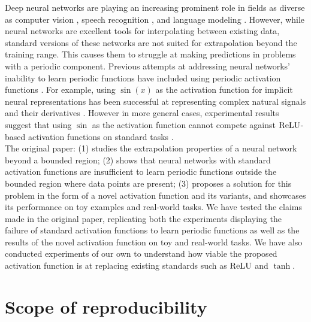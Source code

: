 Deep neural networks are playing an increasing prominent role in fields as diverse as computer vision \cite{10.1007/978-3-030-11024-6_1}, speech recognition \cite{deng_2016}, and language modeling \cite{melis2017state}. However, while neural networks are excellent tools for interpolating between existing data, standard versions of these networks are not suited for extrapolation beyond the training range. This causes them to struggle at making predictions in problems with a periodic component. Previous attempts at addressing neural networks' inability to learn periodic functions have included using periodic activation functions \cite{fourier_one, zhumekenov2019fourier}. For example, using $\sin(x)$ as the activation function for implicit neural representations has been successful at representing complex natural signals and their derivatives \cite{sitzmann2020implicit}. However in more general cases, experimental results suggest that using $\sin$ as the activation function cannot compete against $ \operatorname{ReLU} $-based activation functions \cite{Ramachandran2017SwishAS, DBLP:conf/icml/NairH10, clevert2016fast, xu2015empirical} on standard tasks \cite{Parascandolo2017TamingTW}. \\

The original paper: (1) studies the extrapolation properties of a neural network beyond a bounded region; (2) shows that neural networks with standard activation functions are insufficient to learn periodic functions outside the bounded region where data points are present; (3) proposes a solution for this problem in the form of a novel activation function and its variants, and showcases its performance on toy examples and real-world tasks. We have tested the claims made in the original paper, replicating both the experiments displaying the failure of standard activation functions to learn periodic functions as well as the results of the novel activation function on toy and real-world tasks. We have also conducted experiments of our own to understand how viable the proposed activation function is at replacing existing standards such as $\operatorname{ReLU}$ and $\tanh$. 

\section{Scope of reproducibility}

